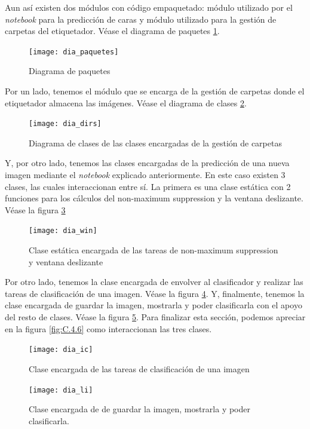 Aun así existen dos módulos con código empaquetado: módulo utilizado por el \textit{notebook} para la predicción de caras y módulo utilizado para la gestión de carpetas del etiquetador. Véase el diagrama de paquetes \ref{fig:C.4.1}.

\begin{figure}[h]
\centering
\texttt{[image: dia\_paquetes]}
\caption{Diagrama de paquetes}
\label{fig:C.4.1}
\end{figure}

Por un lado, tenemos el módulo que se encarga de la gestión de carpetas donde el etiquetador almacena las imágenes. Véase el diagrama de clases \ref{fig:C.4.2}.

\begin{figure}[h]
\centering
\texttt{[image: dia\_dirs]}
\caption[Diagrama de clases para la gestión de carpetas]{Diagrama de clases de las clases encargadas de la gestión de carpetas}
\label{fig:C.4.2}
\end{figure}


Y, por otro lado, tenemos las clases encargadas de la predicción de una nueva imagen mediante el \textit{notebook} explicado anteriormente. En este caso existen 3 clases, las cuales interaccionan entre sí. La primera es una clase estática con 2 funciones para los cálculos del non-maximum suppression y la ventana deslizante. Véase la figura \ref{fig:C.4.3} 


\begin{figure}[h]
\centering
\texttt{[image: dia\_win]}
\caption[Clase estática encargada de varias tareas]{Clase estática encargada de las tareas de non-maximum suppression y ventana deslizante}
\label{fig:C.4.3}
\end{figure}

Por otro lado, tenemos la clase encargada de envolver al clasificador y realizar las tareas de clasificación de una imagen. Véase la figura \ref{fig:C.4.4}. Y, finalmente, tenemos la clase encargada de guardar la imagen, mostrarla y poder clasificarla con el apoyo del resto de clases. Véase la figura \ref{fig:C.4.5}. Para finalizar esta sección, podemos apreciar en la figura \ref{fig:C.4.6} como interaccionan las tres clases.

\begin{figure}
\centering
\texttt{[image: dia\_ic]}
\caption{Clase encargada de las tareas de clasificación de una imagen}
\label{fig:C.4.4}
\end{figure}

\begin{figure}
\centering
\texttt{[image: dia\_li]}
\caption[Clases encargadas de la clasificación]{Clase encargada de de guardar la imagen, mostrarla y poder clasificarla.}
\label{fig:C.4.5}
\end{figure}

